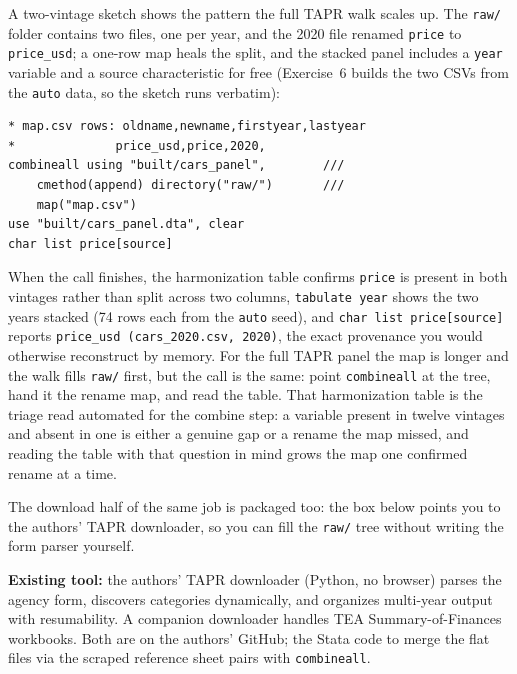 A two-vintage sketch shows the pattern the full TAPR walk scales up. The \texttt{raw/} folder contains two files, one per year, and the 2020 file renamed \texttt{price} to \texttt{price\_usd}; a one-row map heals the split, and the stacked panel includes a \texttt{year} variable and a source characteristic for free (Exercise~6 builds the two CSVs from the \texttt{auto} data, so the sketch runs verbatim):
\par
{\footnotesize
\begin{verbatim}
* map.csv rows: oldname,newname,firstyear,lastyear
*              price_usd,price,2020,
combineall using "built/cars_panel",        ///
    cmethod(append) directory("raw/")       ///
    map("map.csv")
use "built/cars_panel.dta", clear
char list price[source]
\end{verbatim}
}
When the call finishes, the harmonization table confirms \texttt{price} is present in both vintages rather than split across two columns, \texttt{tabulate year} shows the two years stacked (74 rows each from the \texttt{auto} seed), and \texttt{char list price[source]} reports \texttt{price\_usd (cars\_2020.csv, 2020)}, the exact provenance you would otherwise reconstruct by memory. For the full TAPR panel the map is longer and the walk fills \texttt{raw/} first, but the call is the same: point \texttt{combineall} at the tree, hand it the rename map, and read the table. That harmonization table is the triage read automated for the combine step: a variable present in twelve vintages and absent in one is either a genuine gap or a rename the map missed, and reading the table with that question in mind grows the map one confirmed rename at a time.

The download half of the same job is packaged too: the box below points you to the authors' TAPR downloader, so you can fill the \texttt{raw/} tree without writing the form parser yourself.

\begin{kaobox}[frametitle=Package Integration: \texttt{TEA-TAPR-download}]
\textbf{Existing tool:} the authors' TAPR downloader (Python, no browser) parses the agency form, discovers categories dynamically, and organizes multi-year output with resumability. A companion downloader handles TEA Summary-of-Finances workbooks. Both are on the authors' GitHub; the Stata code to merge the flat files via the scraped reference sheet pairs with \texttt{combineall}.
\end{kaobox}

